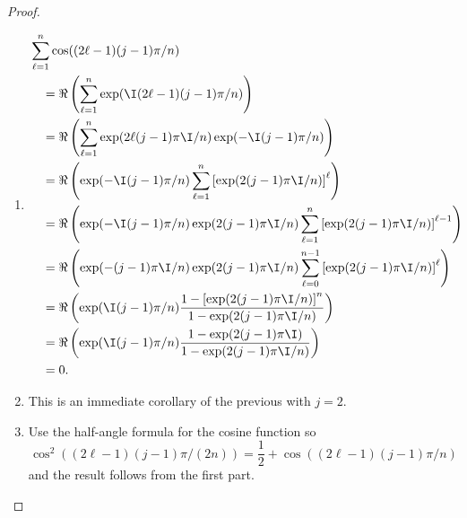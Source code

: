 \documentclass[12pt]{article}
\begin{document}
\begin{proof}
    \begin{enumerate}
        \item
            \begin{align*}
                &\sum_{\ell=1}^{n} \cos((2\ell-1)(j-1)\pi/n) \\
                &\quad = \Re \left ( \sum_{\ell=1}^n \exp (\I (2\ell-1)(j-1)\pi/n)
                \right) \\
                &\quad = \Re \left( \sum_{\ell=1}^n \exp(2\ell(j-1)\pi\I
                /n) \exp(-\I (j-1)\pi/n) \right) \\
                &\quad = \Re \left( \exp(-\I(j-1)\pi/n) \sum_{\ell=1}^n
                \left[ \exp(2 (j-1)\pi \I/n) \right]^\ell \right) \\
                &\quad = \Re \left( \exp(-\I(j-1)\pi/n) \exp( 2 (j-1)\pi
                \I/n) \sum_{\ell=1}^{n} \left[ \exp( 2 (j-1)\pi \I/n)
                \right]^{\ell-1} \right) \\
                &\quad = \Re \left( \exp(-(j-1)\pi\I/n) \exp(2 (j-1)\pi
                \I/n) \sum_{\ell=0}^{n-1} \left[ \exp( 2 (j-1)\pi \I/n)
                \right]^{\ell} \right) \\
                &\quad = \Re \left( \exp(\I (j-1)\pi/n) \frac{1 - \left[
                \exp( 2 (j-1)\pi \I /n) \right]^n}{1 - \exp ( 2(j-1)\pi
                \I/n)} \right) \\
                &\quad = \Re \left( \exp(\I (j-1)\pi/n) \frac{1 - \exp(2
                (j-1)\pi \I)}{1 - \exp(2 (j-1)\pi \I/n)} \right) \\
                &\quad = 0.
            \end{align*}
        \item
            This is an immediate corollary of the previous with \( j=2 \).
        \item
            Use the half-angle formula for the cosine function so
            \[
                \cos^2((2 \ell-1)(j-1)\pi/(2n)) = \frac{1}{2} + \cos((2
                \ell-1)(j-1)\pi/n)
            \] and the result follows from the first part.
    \end{enumerate}

\end{proof}
\end{document}
